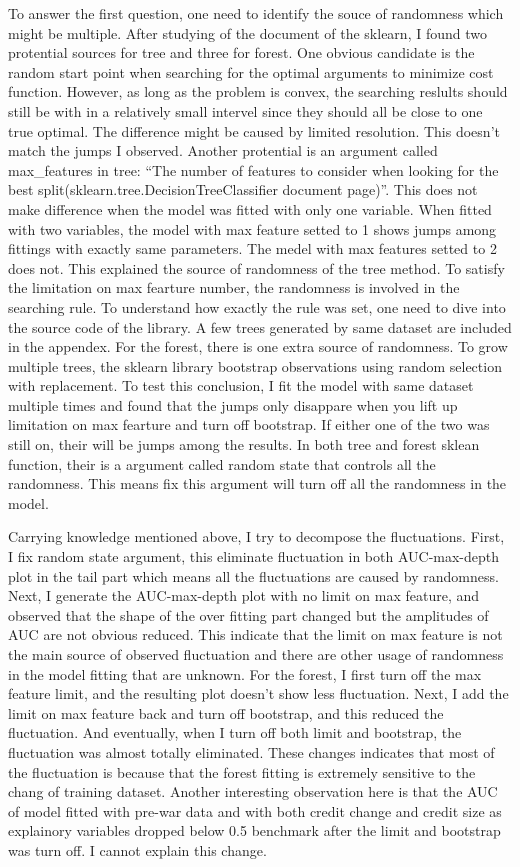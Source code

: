 \documentclass{article}
\begin{document}
To answer the first question, one need to identify the souce of
randomness which might be multiple. After studying of the document of
the sklearn, I found two protential sources for tree and three for
forest. One obvious candidate is the random start point when searching
for the optimal arguments to minimize cost function. However, as long as
the problem is convex, the searching reslults should still be with in a
relatively small intervel since they should all be close to one true
optimal. The difference might be caused by limited resolution. This
doesn't match the jumps I observed. Another protential is an argument
called max\_features in tree: ``The number of features to consider when
looking for the best split(sklearn.tree.DecisionTreeClassifier document
page)''. This does not make difference when the model was fitted with
only one variable. When fitted with two variables, the model with max
feature setted to 1 shows jumps among fittings with exactly same
parameters. The medel with max features setted to 2 does not. This
explained the source of randomness of the tree method. To satisfy the
limitation on max fearture number, the randomness is involved in the
searching rule. To understand how exactly the rule was set, one need to
dive into the source code of the library. A few trees generated by same
dataset are included in the appendex. For the forest, there is one extra
source of randomness. To grow multiple trees, the sklearn library
bootstrap observations using random selection with replacement. To test
this conclusion, I fit the model with same dataset multiple times and
found that the jumps only disappare when you lift up limitation on max
fearture and turn off bootstrap. If either one of the two was still on,
their will be jumps among the results. In both tree and forest sklean
function, their is a argument called random state that controls all the
randomness. This means fix this argument will turn off all the
randomness in the model.

Carrying knowledge mentioned above, I try to decompose the fluctuations.
First, I fix random state argument, this eliminate fluctuation in both
AUC-max-depth plot in the tail part which means all the fluctuations are
caused by randomness. Next, I generate the AUC-max-depth plot with no
limit on max feature, and observed that the shape of the over fitting
part changed but the amplitudes of AUC are not obvious reduced. This
indicate that the limit on max feature is not the main source of
observed fluctuation and there are other usage of randomness in the
model fitting that are unknown. For the forest, I first turn off the max
feature limit, and the resulting plot doesn't show less fluctuation.
Next, I add the limit on max feature back and turn off bootstrap, and
this reduced the fluctuation. And eventually, when I turn off both limit
and bootstrap, the fluctuation was almost totally eliminated. These
changes indicates that most of the fluctuation is because that the
forest fitting is extremely sensitive to the chang of training dataset.
Another interesting observation here is that the AUC of model fitted
with pre-war data and with both credit change and credit size as
explainory variables dropped below 0.5 benchmark after the limit and
bootstrap was turn off. I cannot explain this change.
\end{document}
